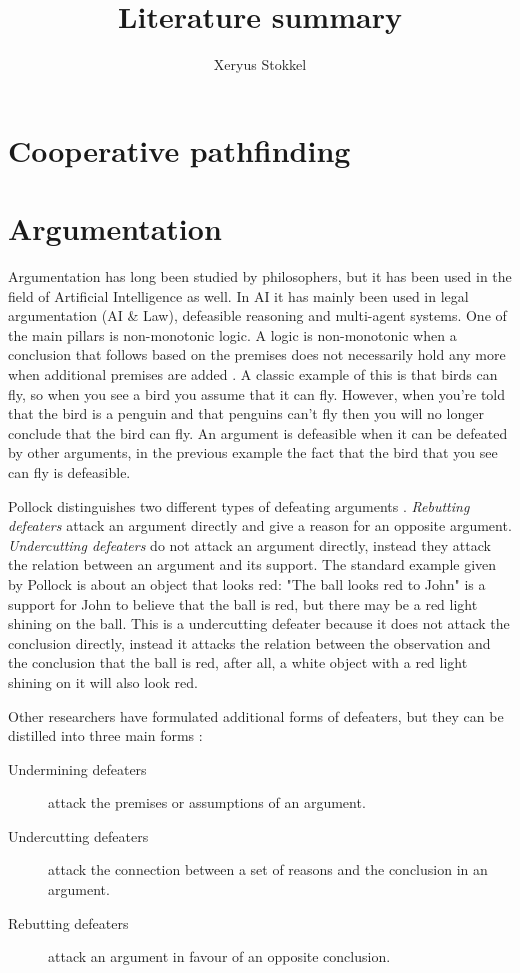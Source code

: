\documentclass[a4paper]{article}
\title{Literature summary}
\author{Xeryus Stokkel}
\begin{document}
\maketitle

\section{Cooperative pathfinding}

\section{Argumentation}
Argumentation has long been studied by philosophers, but it has been used in 
the field of Artificial Intelligence as well. In AI it has mainly been used in 
legal argumentation (AI \& Law), defeasible reasoning and multi-agent systems. 
One of the main pillars is non-monotonic logic. A logic is non-monotonic when a 
conclusion that follows based on the premises does not necessarily hold any 
more when additional premises are added \cite{vaneemeren2014}. A classic 
example of this is that birds can fly, so when you see a bird you assume that 
it can fly. However, when you're told that the bird is a penguin and that 
penguins can't fly then you will no longer conclude that the bird can fly. An 
argument is defeasible when it can be defeated by other arguments, in the 
previous example the fact that the bird that you see can fly is defeasible.

Pollock distinguishes two different types of defeating arguments 
\cite{pollock1995}. \emph{Rebutting defeaters} attack an argument directly and 
give a reason for an opposite argument. \emph{Undercutting defeaters} do not 
attack an argument directly, instead they attack the relation between an 
argument and its support. The standard example given by Pollock is about an 
object that looks red: "The ball looks red to John" is a support for John to 
believe that the ball is red, but there may be a red light shining on the ball. 
This is a undercutting defeater because it does not attack the conclusion 
directly, instead it attacks the relation between the observation and the 
conclusion that the ball is red, after all, a white object with a red light 
shining on it will also look red.

Other researchers have formulated additional forms of defeaters, but they can 
be distilled into three main forms \cite{vaneemeren2014}:
\begin{description}
	\item[Undermining defeaters] attack the premises or assumptions of an 
	argument.
	\item[Undercutting defeaters] attack the connection between a set of 
	reasons and the conclusion in an argument.
	\item[Rebutting defeaters] attack an argument in favour of an opposite 
	conclusion.
\end{description}
\end{document}
